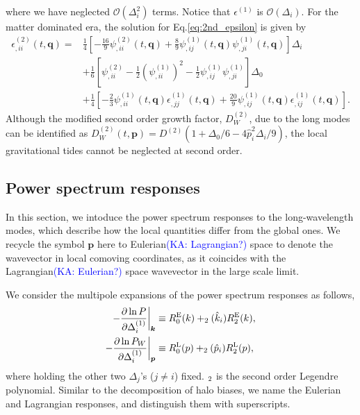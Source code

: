 \documentclass[a4paper,11pt]{article}
\let\L\relax
\DeclareMathOperator{\L}{\mathcal{L}}
\newcommand{\vq}{{\bm q}}
\newcommand{\vk}{{\bm k}}
\newcommand{\vp}{{\bm p}}
\newcommand{\Euler}{\mathrm{E}}
\newcommand{\Lagrange}{\mathrm{L}}
\newcommand{\KA}[1]{\textcolor{Blue}{(KA: #1)}}
\begin{document}
where we have neglected $\mathcal{O}(\Delta_i^2)$ terms.
Notice that $\epsilon^{(1)}$ is $\mathcal{O}(\Delta_i)$.
For the matter dominated era,
the solution for Eq.\eqref{eq:2nd_epsilon} is given by
\begin{align}
\epsilon^{(2)}_{,ii}(t, \vq)
=&\frac14 \left[-\frac{16}{9}\psi^{(2)}_{,ii}(t,\vq) + \frac89\psi^{(1)}_{,ij}(t,\vq)\psi^{(1)}_{,ji}(t,\vq) \right]\Delta_i
\nonumber\\
&+\frac16 \left[\psi_{,ii}^{(2)} - \frac12\left( \psi^{(1)}_{,ii}\right)^2- \frac12\psi^{(1)}_{,ij}\psi^{(1)}_{,ji}   \right]\Delta_0
\nonumber\\
&+\frac14\left[-\frac23\psi^{(1)}_{,ii}(t,\vq)\epsilon_{,jj}^{(1)}(t,\vq) + \frac{20}{9}\psi^{(1)}_{,ij}(t,\vq)\epsilon_{,ij}^{(1)}(t,\vq)  \right].
\end{align}
Although the modified second order growth factor, $D^{(2)}_W$, due to the long modes can be identified as $D^{(2)}_W (t, \vp) = D^{(2)}(1 + \Delta_0/6 - 4\hat{p}_i^2\Delta_i/9 )$, the local gravitational tides cannot be neglected at second order.


\subsection{Power spectrum responses}
\label{sub:resp}

In this section, we intoduce the power spectrum responses to the long-wavelength modes,
which describe how the local quantities differ from the global ones.
We recycle the symbol $\vp$ here to Eulerian\KA{Lagrangian?} space to denote the wavevector in
local comoving coordinates, as it coincides with the Lagrangian\KA{Eulerian?}  space
wavevector in the large scale limit.

We consider the multipole expansions of the power spectrum responses as follows,
\begin{align}
    - \frac{\partial\ln P}{\partial\Delta^{(1)}_i} \bigg|_\vk
    &\equiv R^\Euler_0(k) + \L_2(\hat k_i) R^\Euler_2(k), \nonumber\\
    - \frac{\partial\ln P_W}{\partial\Delta^{(1)}_i} \bigg|_\vp
    &\equiv R^\Lagrange_0(p) + \L_2(\hat p_i) R^\Lagrange_2(p),
\end{align}
where holding the other two $\Delta_j$'s ($j \neq i$) fixed.
$\L_2$ is the second order Legendre polynomial.
Similar to the decomposition of halo biases, we name the Eulerian and
Lagrangian responses, and distinguish them with superscripts.
\end{document}

